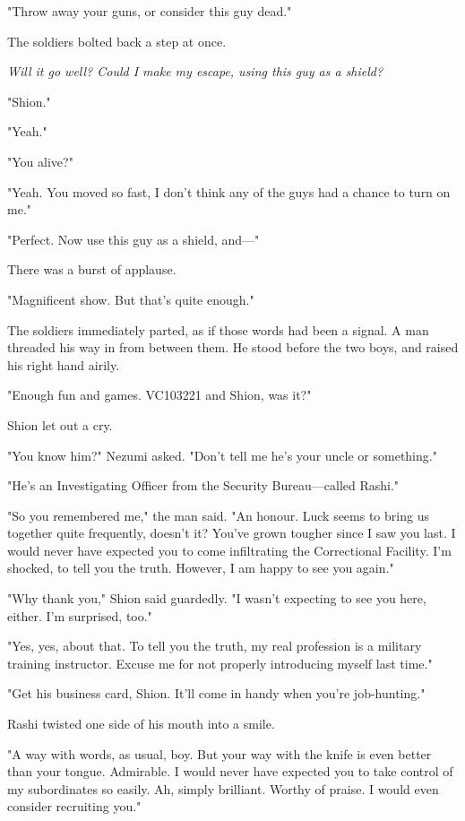 "Throw away your guns, or consider this guy dead."

The soldiers bolted back a step at once.

\emph{Will it go well? Could I make my escape, using this guy as a shield?}

"Shion."

"Yeah."

"You alive?"

"Yeah. You moved so fast, I don't think any of the guys had a chance to
turn on me."

"Perfect. Now use this guy as a shield, and---"

There was a burst of applause.

"Magnificent show. But that's quite enough."

The soldiers immediately parted, as if those words had been a signal. A
man threaded his way in from between them. He stood before the two boys,
and raised his right hand airily.

"Enough fun and games. VC103221 and Shion, was it?"

Shion let out a cry.

"You know him?" Nezumi asked. "Don't tell me he's your uncle or
something."

"He's an Investigating Officer from the Security Bureau---called Rashi."

"So you remembered me," the man said. "An honour. Luck seems to bring us
together quite frequently, doesn't it? You've grown tougher since I saw
you last. I would never have expected you to come infiltrating the
Correctional Facility. I'm shocked, to tell you the truth. However, I am
happy to see you again."

"Why thank you," Shion said guardedly. "I wasn't expecting to see you
here, either. I'm surprised, too."

"Yes, yes, about that. To tell you the truth, my real profession is a
military training instructor. Excuse me for not properly introducing
myself last time."

"Get his business card, Shion. It'll come in handy when you're
job-hunting."

Rashi twisted one side of his mouth into a smile.

"A way with words, as usual, boy. But your way with the knife is even
better than your tongue. Admirable. I would never have expected you to
take control of my subordinates so easily. Ah, simply brilliant. Worthy
of praise. I would even consider recruiting you."

